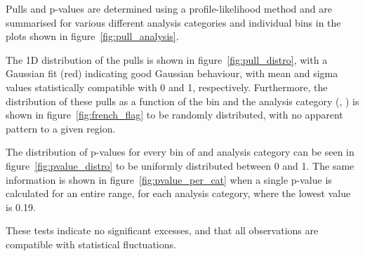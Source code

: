 
Pulls and p-values are determined using a profile-likelihood method and are
summarised for various different analysis categories and individual \HT bins
in the plots shown in figure~\ref{fig:pull_analysis}.

The 1D distribution of the
pulls is shown in figure~\ref{fig:pull_distro}, with a Gaussian fit (red)
indicating good Gaussian behaviour, with mean and sigma values statistically
compatible with 0 and 1, respectively. Furthermore, the distribution of
these pulls as a function of the \HT bin and
the analysis category (\nb, \nj) is shown in figure~\ref{fig:french_flag} to be
randomly distributed, with no apparent pattern to a given region.

The distribution of p-values for every bin of \HT and analysis category can be
seen in figure~\ref{fig:pvalue_distro} to be uniformly distributed between 0
and 1. The same information is shown in figure~\ref{fig:pvalue_per_cat} when a
single p-value is calculated for an entire \HT range, for each analysis
category, where the lowest value is 0.19.

These tests indicate no significant excesses, and that all observations are
compatible with statistical fluctuations.




